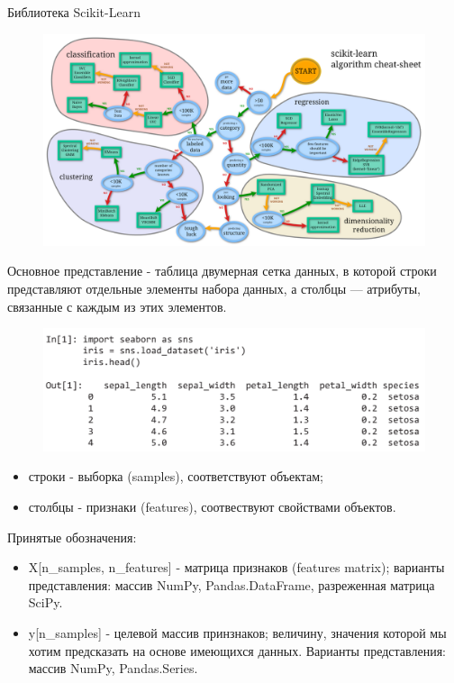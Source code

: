 \documentclass{beamer}
\begin{document}
\begin{frame}{Библиотека Scikit-Learn}
\begin{figure}[h]
\centering
\includegraphics[scale=0.2]{images/scikit.png}
\end{figure}
\end{frame}

\begin{frame}
\begin{block}{Основное представление - таблица}
двумерная сетка данных, в которой строки представляют отдельные элементы набора данных, а столбцы — атрибуты, связанные с каждым из этих элементов.
\end{block}
\begin{figure}[h]
\centering
\includegraphics[scale=0.4]{images/lec10-pic01.png}
\end{figure}
\begin{itemize}
\item строки - выборка (samples), соответствуют объектам;
\item столбцы - признаки (features), соотвествуют свойствами объектов.
\end{itemize}
\end{frame}

\begin{frame}
Принятые обозначения:
\begin{itemize}
\item X[n\_samples, n\_features] - матрица признаков (features matrix); варианты представления: массив NumPy, Pandas.DataFrame, разреженная матрица SciPy.
\item y[n\_samples] - целевой массив принзнаков; величину, значения которой мы хотим предсказать на основе имеющихся данных. Варианты представления: массив NumPy, Pandas.Series.
\end{itemize}
\end{frame}
\end{document}
